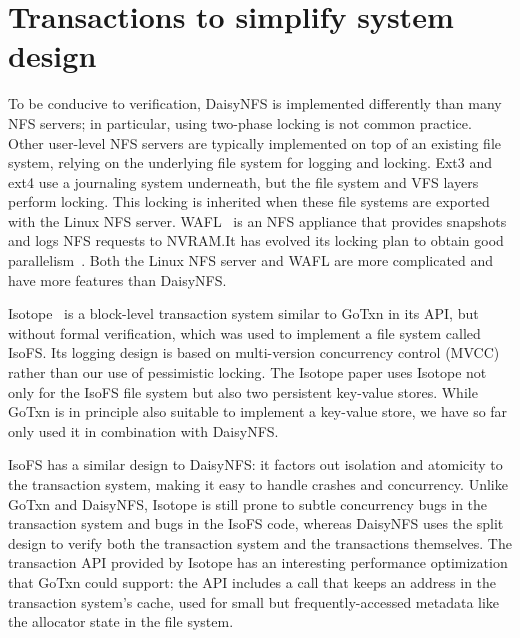 \section{Transactions to simplify system design}
\label{sec:rel:txn}

To be conducive to verification, DaisyNFS is implemented differently than
many NFS servers; in particular, using two-phase locking is not common
practice.  Other user-level NFS servers are typically implemented on
top of an existing file system, relying on the underlying file system
for logging and locking. Ext3 and ext4 use a journaling system underneath, but
the file system and VFS layers perform locking. This locking is inherited when
these file systems are exported with the Linux NFS server. WAFL~\cite{wafl:hitz}
is an NFS appliance that provides snapshots and logs NFS requests to
NVRAM.\@  It has evolved its locking plan to obtain good
parallelism~\cite{curtis-maury:waffinity}.  Both the Linux NFS server and WAFL
are more complicated and have more features than DaisyNFS.\@

Isotope~\cite{shin:isotope} is a block-level transaction system similar to GoTxn
in its API, but without formal verification, which was used to implement a file
system called IsoFS. Its logging design is based on
multi-version concurrency control (MVCC)~\cite{bernstein:concurrency-dbs} rather than our use of pessimistic
locking. The Isotope paper uses Isotope not only for the IsoFS file system but
also two persistent key-value stores. While GoTxn is in principle also suitable to implement a
key-value store, we have so far only used it in combination with DaisyNFS.\@

IsoFS has a similar design to DaisyNFS: it factors out isolation and atomicity to the transaction
system, making it easy to handle crashes and concurrency. Unlike GoTxn and
DaisyNFS, Isotope is still prone to subtle concurrency bugs in the transaction
system and bugs in the IsoFS code, whereas DaisyNFS uses the split design to
verify both the transaction system and the transactions themselves. The transaction API provided
by Isotope has an interesting performance optimization that GoTxn could support:
the API includes a  call that keeps an address in the
transaction system's cache, used for small but frequently-accessed metadata like
the allocator state in the file system.
